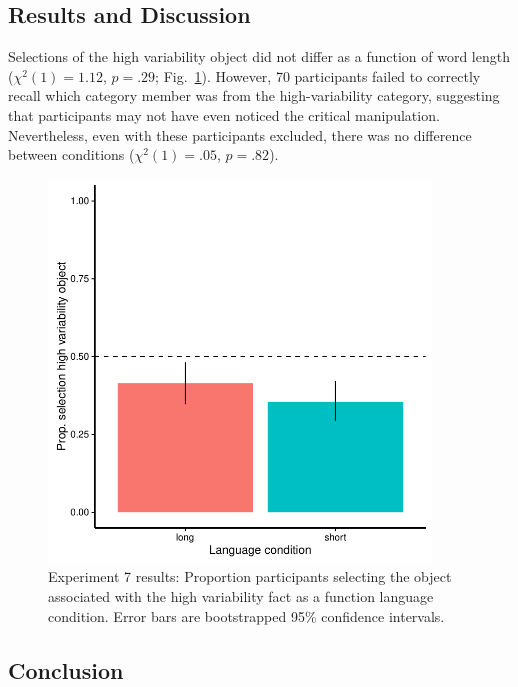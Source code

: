 \subsection{Results and Discussion}

Selections of the high variability object did not differ as a function of word length (${\chi}^2$$(1) = 1.12$, $p = .29$; Fig.\ \ref{fig:var_plot}). However, 70 participants failed to correctly recall which category member was from the high-variability category, suggesting that participants may not have even noticed the critical manipulation. Nevertheless, even with these participants excluded, there was no difference between conditions (${\chi}^2$$(1) = .05$, $p = .82$).

  \begin{figure}
 \begin{center}
  \includegraphics[width=4in]{figs/var_results.pdf}
  \caption{\label{fig:var_plot} Experiment 7 results: Proportion participants selecting the object associated with the high variability fact as a function language condition.  Error bars are bootstrapped 95\% confidence intervals.}
 \end{center}
\end{figure}

\subsection{Conclusion}









